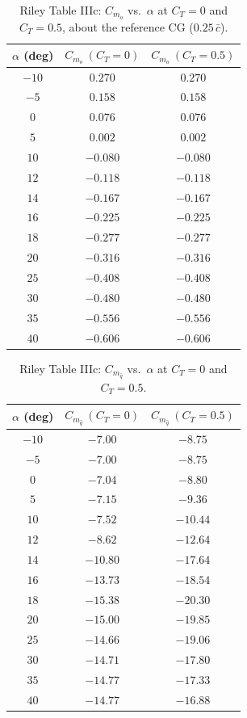 \documentclass[journal ]{new-aiaa}
\begin{document}
\begin{table}[H]
\centering
\caption{Riley Table IIIc: $C_{m_o}$ vs.\ $\alpha$ at $C_T = 0$ and $C_T = 0.5$, about the reference CG ($0.25\,\bar{c}$).}
\label{tab:riley_cm}
\begin{tabular}{ccc}
\toprule
$\alpha$ (deg) & $C_{m_o}\ (C_T{=}0)$ & $C_{m_o}\ (C_T{=}0.5)$ \\
\midrule
$-10$ & $ 0.270$ & $ 0.270$ \\
$-5$  & $ 0.158$ & $ 0.158$ \\
$ 0$  & $ 0.076$ & $ 0.076$ \\
$ 5$  & $ 0.002$ & $ 0.002$ \\
$10$  & $-0.080$ & $-0.080$ \\
$12$  & $-0.118$ & $-0.118$ \\
$14$  & $-0.167$ & $-0.167$ \\
$16$  & $-0.225$ & $-0.225$ \\
$18$  & $-0.277$ & $-0.277$ \\
$20$  & $-0.316$ & $-0.316$ \\
$25$  & $-0.408$ & $-0.408$ \\
$30$  & $-0.480$ & $-0.480$ \\
$35$  & $-0.556$ & $-0.556$ \\
$40$  & $-0.606$ & $-0.606$ \\
\bottomrule
\end{tabular}
\end{table}

\begin{table}[H]
\centering
\caption{Riley Table IIIc: $C_{m_{\hat{q}}}$ vs.\ $\alpha$ at $C_T = 0$ and $C_T = 0.5$.}
\label{tab:riley_cmq}
\begin{tabular}{ccc}
\toprule
$\alpha$ (deg) & $C_{m_{\hat{q}}}\ (C_T{=}0)$ & $C_{m_{\hat{q}}}\ (C_T{=}0.5)$ \\
\midrule
$-10$ & $ -7.00$ & $ -8.75$ \\
$-5$  & $ -7.00$ & $ -8.75$ \\
$ 0$  & $ -7.04$ & $ -8.80$ \\
$ 5$  & $ -7.15$ & $ -9.36$ \\
$10$  & $ -7.52$ & $-10.44$ \\
$12$  & $ -8.62$ & $-12.64$ \\
$14$  & $-10.80$ & $-17.64$ \\
$16$  & $-13.73$ & $-18.54$ \\
$18$  & $-15.38$ & $-20.30$ \\
$20$  & $-15.00$ & $-19.85$ \\
$25$  & $-14.66$ & $-19.06$ \\
$30$  & $-14.71$ & $-17.80$ \\
$35$  & $-14.77$ & $-17.33$ \\
$40$  & $-14.77$ & $-16.88$ \\
\bottomrule
\end{tabular}
\end{table}
\end{document}
